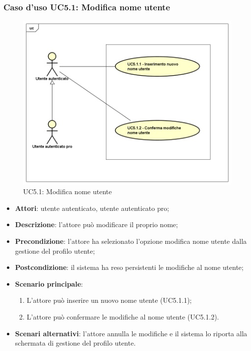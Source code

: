 \subsubsection{Caso d'uso UC5.1: Modifica nome utente}
\label{UC5.1}
\begin{figure}
	\centering
	\includegraphics[scale=0.5]{UML/UC5_1.png}
	\caption{UC5.1: Modifica nome utente}
\end{figure}
\begin{itemize}
	\item \textbf{Attori}: utente autenticato, utente autenticato pro;
	\item \textbf{Descrizione}: l'attore può modificare il proprio nome;
	\item \textbf{Precondizione}: l'attore ha selezionato l'opzione modifica nome utente dalla gestione del profilo utente;
	\item \textbf{Postcondizione}: il sistema ha reso persistenti le modifiche al nome utente;
	\item \textbf{Scenario principale}:
		\begin{enumerate}
			\item L'attore può inserire un nuovo nome utente (UC5.1.1);
			\item L'attore può confermare le modifiche al nome utente (UC5.1.2).
		\end{enumerate}
	\item \textbf{Scenari alternativi}: l'attore annulla le modifiche e il sistema lo riporta alla schermata di gestione del profilo utente.
\end{itemize}


